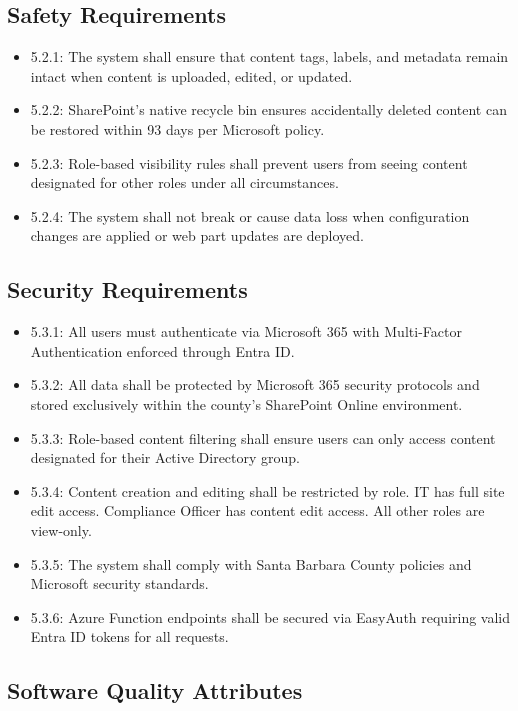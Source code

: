 \documentclass[12pt]{article}
\begin{document}
\subsection{Safety Requirements}

\begin{itemize}[leftmargin=*]
\item  5.2.1: The system shall ensure that content tags, labels, and metadata remain intact when content is uploaded, edited, or updated.
\item  5.2.2: SharePoint's native recycle bin ensures accidentally deleted content can be restored within 93 days per Microsoft policy.
\item  5.2.3: Role-based visibility rules shall prevent users from seeing content designated for other roles under all circumstances.
\item  5.2.4: The system shall not break or cause data loss when configuration changes are applied or web part updates are deployed.
\end{itemize}

\subsection{Security Requirements}

\begin{itemize}[leftmargin=*]
\item  5.3.1: All users must authenticate via Microsoft 365 with Multi-Factor Authentication enforced through Entra ID.
\item  5.3.2: All data shall be protected by Microsoft 365 security protocols and stored exclusively within the county's SharePoint Online environment.
\item  5.3.3: Role-based content filtering shall ensure users can only access content designated for their Active Directory group.
\item  5.3.4: Content creation and editing shall be restricted by role. IT has full site edit access. Compliance Officer has content edit access. All other roles are view-only.
\item  5.3.5: The system shall comply with Santa Barbara County policies and Microsoft security standards.
\item  5.3.6: Azure Function endpoints shall be secured via EasyAuth requiring valid Entra ID tokens for all requests.
\end{itemize}

\subsection{Software Quality Attributes}
\end{document}
